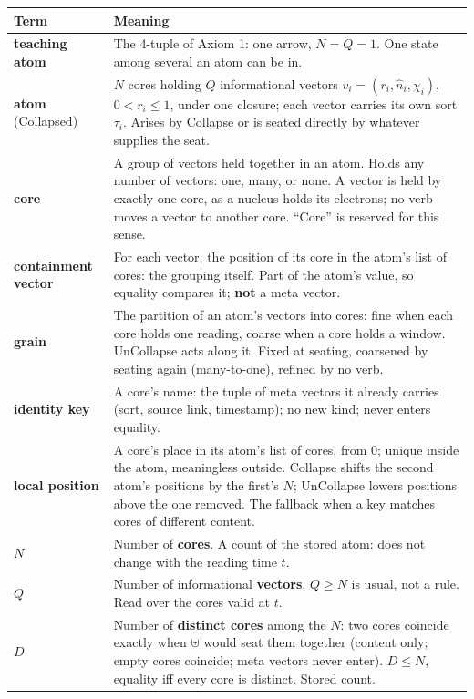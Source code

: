 \documentclass[10.5pt]{article}
\begin{document}
{\small\setlength{\tabcolsep}{4pt}\begin{longtable}{L{3.4cm}L{13.2cm}}
\toprule
\textbf{Term} & \textbf{Meaning} \\
\midrule
\endhead
\textbf{teaching atom} & The 4-tuple of Axiom 1: one arrow, $N=Q=1$. One state among several an atom can be in. \\
\textbf{atom} (Collapsed) & $N$ cores holding $Q$ informational vectors $v_i=(r_i,\hat n_i,\chi_i)$, $0<r_i\le1$, under one closure; each vector carries its own sort $\tau_i$. Arises by Collapse or is seated directly by whatever supplies the seat. \\
\textbf{core} & A group of vectors held together in an atom. Holds any number of vectors: one, many, or none. A vector is held by exactly one core, as a nucleus holds its electrons; no verb moves a vector to another core. “Core” is reserved for this sense. \\
\textbf{containment vector} & For each vector, the position of its core in the atom's list of cores: the grouping itself. Part of the atom's value, so equality compares it; \textbf{not} a meta vector. \\
\textbf{grain} & The partition of an atom's vectors into cores: fine when each core holds one reading, coarse when a core holds a window. UnCollapse acts along it. Fixed at seating, coarsened by seating again (many-to-one), refined by no verb. \\
\textbf{identity key} & A core's name: the tuple of meta vectors it already carries (sort, source link, timestamp); no new kind; never enters equality. \\
\textbf{local position} & A core's place in its atom's list of cores, from $0$; unique inside the atom, meaningless outside. Collapse shifts the second atom's positions by the first's $N$; UnCollapse lowers positions above the one removed. The fallback when a key matches cores of different content. \\
$N$ & Number of \textbf{cores}. A count of the stored atom: does not change with the reading time $t$. \\
$Q$ & Number of informational \textbf{vectors}. $Q\ge N$ is usual, not a rule. Read over the cores valid at $t$. \\
$D$ & Number of \textbf{distinct cores} among the $N$: two cores coincide exactly when $\uplus$ would seat them together (content only; empty cores coincide; meta vectors never enter). $D\le N$, equality iff every core is distinct. Stored count. \\

\end{longtable}}
\end{document}
